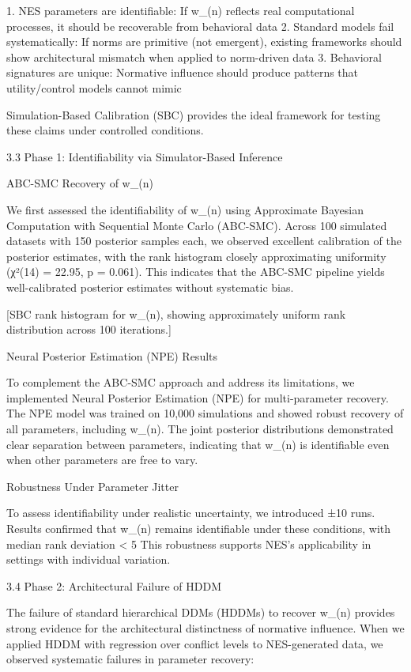 1.  NES parameters are identifiable: If w_(n) reflects real
    computational processes, it should be recoverable from behavioral
    data
2.  Standard models fail systematically: If norms are primitive (not
    emergent), existing frameworks should show architectural mismatch
    when applied to norm-driven data
3.  Behavioral signatures are unique: Normative influence should produce
    patterns that utility/control models cannot mimic

Simulation-Based Calibration (SBC) provides the ideal framework for
testing these claims under controlled conditions.

3.3 Phase 1: Identifiability via Simulator-Based Inference

ABC-SMC Recovery of w_(n)

We first assessed the identifiability of w_(n) using Approximate
Bayesian Computation with Sequential Monte Carlo (ABC-SMC). Across 100
simulated datasets with 150 posterior samples each, we observed
excellent calibration of the posterior estimates, with the rank
histogram closely approximating uniformity (χ²(14) = 22.95, p = 0.061).
This indicates that the ABC-SMC pipeline yields well-calibrated
posterior estimates without systematic bias.

[SBC rank histogram for w_(n), showing approximately uniform rank
distribution across 100 iterations.]

Neural Posterior Estimation (NPE) Results

To complement the ABC-SMC approach and address its limitations, we
implemented Neural Posterior Estimation (NPE) for multi-parameter
recovery. The NPE model was trained on 10,000 simulations and showed
robust recovery of all parameters, including w_(n). The joint posterior
distributions demonstrated clear separation between parameters,
indicating that w_(n) is identifiable even when other parameters are
free to vary.

Robustness Under Parameter Jitter

To assess identifiability under realistic uncertainty, we introduced
±10%
runs. Results confirmed that w_(n) remains identifiable under these
conditions, with median rank deviation < 5%
This robustness supports NES’s applicability in settings with individual
variation.

3.4 Phase 2: Architectural Failure of HDDM

The failure of standard hierarchical DDMs (HDDMs) to recover w_(n)
provides strong evidence for the architectural distinctness of normative
influence. When we applied HDDM with regression over conflict levels to
NES-generated data, we observed systematic failures in parameter
recovery:

